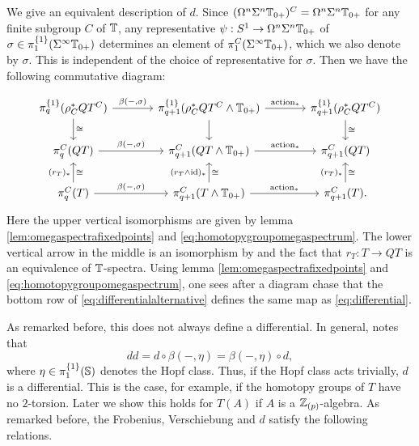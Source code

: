 We give an equivalent description of $d$. Since
$(\Omega^n\Sigma^n \mathbb{T}_{0+})^C = \Omega^n\Sigma^n \mathbb{T}_{0+}$ 
for any finite subgroup $C$ of $\mathbb{T}$, any representative
$\psi:S^1\to \Omega^n\Sigma^n \mathbb{T}_{0+}$ of $\sigma
\in \pi_1^{\{1\}}(\Sigma^\infty \mathbb{T}_{0+})$ determines an element of
$\pi_1^{C}(\Sigma^\infty \mathbb{T}_{0+})$, which we also denote by $\sigma$.
This is independent of the choice of representative for $\sigma$.
Then we have the following commutative diagram:

\begin{equation}\label{eq:differentialalternative}
\begin{tikzcd}[column sep = large]
\pi_q^{\{1\}}(\rho^\ast_C QT^C)
\arrow{r}{\beta(-,\sigma)} \arrow{d}{\cong}
&\pi_{q+1}^{\{1\}}(\rho^\ast_C QT^C\wedge \TT_{0+})
\arrow{r}{\mathrm{action}_\ast} \arrow{d}
&\pi_{q+1}^{\{1\}}(\rho^\ast_C QT^C)
\arrow{d}{\cong}\\
\pi_q^C(QT)
\arrow{r}{\beta(-,\sigma)}
&\pi_{q+1}^C(QT\wedge \TT_{0+})
\arrow{r}{\mathrm{action}_\ast}
&\pi_{q+1}^C(QT)\\
\pi_q^C(T)
\arrow{r}{\beta(-,\sigma)}\arrow{u}{(r_T)_\ast}[swap]{\cong}
&\pi_{q+1}^C(T\wedge \TT_{0+})
\arrow{u}{(r_T\wedge \mathrm{id})_\ast}[swap]{\cong}\arrow{r}{\mathrm{action}_\ast}
&\pi_{q+1}^C(T).
\arrow{u}{(r_T)_\ast}[swap]{\cong}
\end{tikzcd}
\end{equation}
Here the upper vertical isomorphisms are given by lemma 
\ref{lem:omegaspectrafixedpoints} and \eqref{eq:homotopygroupomegaspectrum}. 
The lower vertical 
arrow in the middle is an isomorphism by \cite[Theorem~III.3.11, 
\pno~47]{mandellmay} and the fact that $r_T:T\to QT$
is an equivalence of $\mathbb{T}$-spectra. Using lemma 
\ref{lem:omegaspectrafixedpoints} and \eqref{eq:homotopygroupomegaspectrum},
one sees after a diagram chase that the bottom row of \eqref{eq:differentialalternative}
defines the same map as \eqref{eq:differential}.



As remarked before, this does not always
define a differential. In general, \cite[(1.4.4), \pno~13]{hesselholtacta} notes that
\[dd = d\circ \beta(-,\eta) = \beta(-,\eta)\circ d,\]
where $\eta\in \pi_1^{\{1\}}(\mathbb{S})$ denotes  the Hopf class. Thus, if
the Hopf class acts trivially, $d$ is a differential. This is the case, for example,
if the homotopy groups of $T$ have no $2$-torsion. Later we show
this holds for $T(A)$ if $A$ is a $\mathbb{Z}_{(p)}$-algebra. As remarked before, the Frobenius,
Verschiebung and $d$ satisfy the following relations.

